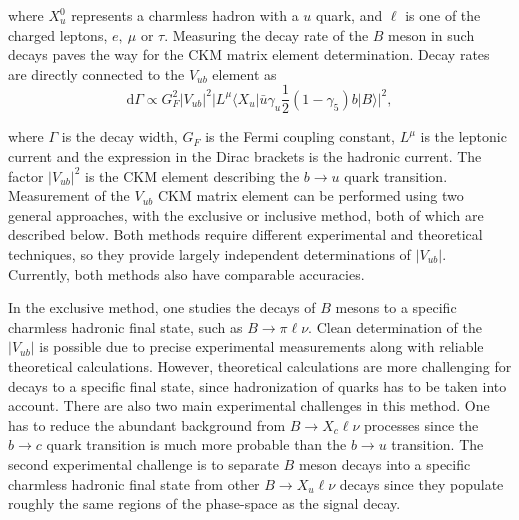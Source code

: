 where $X_u^0$ represents a charmless hadron with a $u$ quark, and $\ell$ is one of the charged leptons, $e,~\mu$ or $\tau$. Measuring the decay rate of the $B$ meson in such decays paves the way for the CKM matrix element determination. Decay rates are directly connected to the $V_{ub}$ element as
\begin{equation}
\mathrm{d} \Gamma \propto G_F^2 \vert V_{ub} \vert ^2 \vert L^\mu \langle X_u \vert \bar u \gamma_u \frac{1}{2} (1-\gamma_5) b \vert B \rangle \vert ^2,
\end{equation}

where $\Gamma$ is the decay width, $G_F$ is the Fermi coupling constant, $L^\mu$ is the leptonic current and the expression in the Dirac brackets is the hadronic current. The factor $\vert V_{ub} \vert ^2$ is the CKM element describing the $b \to u$ quark transition. Measurement of the $V_{ub}$ CKM matrix element can be performed using two general approaches, with the exclusive or inclusive method, both of which are described below. Both methods require different experimental and theoretical techniques, so they provide largely independent determinations of $\vert V_{ub} \vert$. Currently, both methods also have comparable accuracies. 

In the exclusive method, one studies the decays of $B$ mesons to a specific charmless hadronic final state, such as $B \to \pi \ell \nu$. Clean determination of the $\vert V_{ub}\vert$ is possible due to precise experimental measurements along with reliable theoretical calculations. However, theoretical calculations are more challenging for decays to a specific final state, since hadronization of quarks has to be taken into account. There are also two main experimental challenges in this method. One has to reduce the abundant background from $B \to X_c \ell \nu$ processes since the $b \to c$ quark transition is much more probable than the $b \to u$ transition. The second experimental challenge is to separate $B$ meson decays into a specific charmless hadronic final state from other $B \to X_u \ell \nu$ decays since they populate roughly the same regions of the phase-space as the signal decay.

